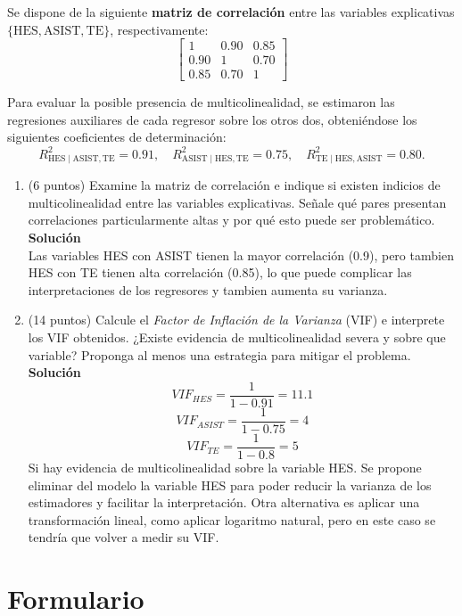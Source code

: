 \documentclass[10pt,a4paper]{article}
\begin{document}
\begin{enumerate}
\begin{enumerate}
Se dispone de la siguiente \textbf{matriz de correlación} entre las variables explicativas \(\{\text{HES}, \text{ASIST}, \text{TE}\}\), respectivamente:
\[
\begin{bmatrix}
1 & 0.90 & 0.85 \\
0.90 & 1 & 0.70 \\
0.85 & 0.70 & 1
\end{bmatrix}
\]

Para evaluar la posible presencia de multicolinealidad, se estimaron las regresiones auxiliares de cada regresor sobre los otros dos, obteniéndose los siguientes coeficientes de determinación:
\[
R^2_{\text{HES}\mid \text{ASIST},\text{TE}} = 0.91,\quad
R^2_{\text{ASIST}\mid \text{HES},\text{TE}} = 0.75,\quad
R^2_{\text{TE}\mid \text{HES},\text{ASIST}} = 0.80.
\]
\begin{enumerate}
  \item (6 puntos) Examine la matriz de correlación e indique si existen indicios de multicolinealidad entre las variables explicativas. Señale qué pares presentan correlaciones particularmente altas y por qué esto puede ser problemático.\\
  \textbf{Solución}
  \\
  Las variables HES con ASIST tienen la mayor correlación (0.9), pero tambien HES con TE tienen alta correlación (0.85), lo que puede complicar las interpretaciones de los regresores y tambien aumenta su varianza.
  
  \item (14 puntos) Calcule el \textit{Factor de Inflación de la Varianza} (VIF) e interprete los VIF obtenidos. ¿Existe evidencia de multicolinealidad severa y sobre que variable? Proponga al menos una estrategia para mitigar el problema.\\
  \textbf{Solución}
  \\
    $$VIF_{HES}=\frac{1}{1-0.91}=11.1$$
    $$VIF_{ASIST}=\frac{1}{1-0.75}=4$$
    $$VIF_{TE}=\frac{1}{1-0.8}=5$$
    Si hay evidencia de multicolinealidad sobre la variable HES. Se propone eliminar del modelo la variable HES para poder reducir la varianza de los estimadores y facilitar la interpretación. Otra alternativa es aplicar una transformación lineal, como aplicar logaritmo natural, pero en este caso se tendría que volver a medir su VIF.
 \end{enumerate}

\newpage
\section*{Formulario}
\begin{itemize}




\end{itemize}
\end{enumerate}
\end{enumerate}
\end{document}
